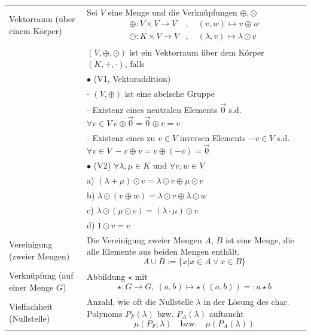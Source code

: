 \documentclass{article}
\begin{document}
\begin{xltabular}{\linewidth}{p{0.33\textwidth}|X}
	\hline
		Vektorraum (über einem Körper) & Sei $V$ eine Menge und die Verknüpfungen $\oplus, \odot$
			{\begin{align*}
				\oplus: V\times V \rightarrow V &,\quad (v,w) \mapsto v\oplus w \\
				\odot: K\times V\rightarrow V &,\quad (\lambda, v) \mapsto \lambda \odot v
			\end{align*}} \\
			& $(V,\oplus,\odot)$ ist ein Vektorraum über dem Körper $(K,+,\cdot)$, falls \\
			& $\bullet$ \textcolor{gruen}{(V1, Vektoraddition)} \\
			& \quad - $(V,\oplus)$ ist eine abelsche Gruppe \\
			& \quad - Existenz eines neutralen Elements $\vec{0}$ s.d. $\forall v\in V\ v\oplus \vec{0} = \vec{0}\oplus v = v$ \\
			& \quad - Existenz eines zu $v\in V$ inversen Elements $-v\in V$ s.d. $\forall v\in V\ -v\oplus v = v\oplus (-v) = \vec{0}$ \\
			& $\bullet$ \textcolor{gruen}{(V2)} $\forall \lambda, \mu\in K$ und $\forall v,w \in V$ \\
			& \quad a) $(\lambda + \mu) \odot v = \lambda \odot v \oplus \mu \odot v$ \\
			& \quad b) $\lambda \odot (v \oplus w) = \lambda \odot v \oplus \lambda \odot w$ \\
			& \quad c) $\lambda \odot (\mu \odot v) = (\lambda \cdot \mu) \odot v$ \\
			& \quad d) $1\odot v = v$ \\
	\hline
		Vereinigung (zweier Mengen) & Die Vereinigung zweier Mengen $A$, $B$ ist eine Menge, die alle Elemente aus beiden Mengen enthält.
			$$A\cup B := \{x | x\in A \vee x\in B\}$$ \\
	\hline
		Verknüpfung (auf einer Menge $G$) & Abbildung $\star$ mit
			$$\star: G \rightarrow G,\ (a,b) \mapsto \star((a,b)) =: a\star b$$ \\
	\hline		
		Vielfachheit (Nullstelle) & Anzahl, wie oft die Nullstelle $\lambda$ in der Lösung des char. Polynoms $P_F(\lambda)$ bzw. $P_A(\lambda)$ auftaucht
			$$\mu(P_F;\lambda) \quad\text{bzw.}\quad \mu(P_A(\lambda))$$ \\
	\hline\hline
\end{xltabular}
\end{document}
